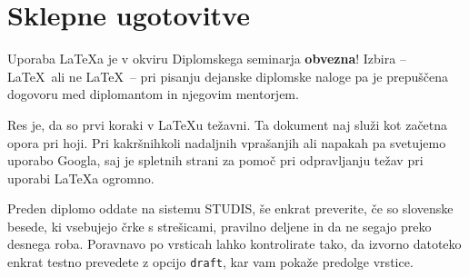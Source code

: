 \chapter{Sklepne ugotovitve}

Uporaba \LaTeX{a} je v okviru Diplomskega seminarja \textbf{obvezna}!
Izbira -- \LaTeX\ ali ne \LaTeX\ -- pri pisanju dejanske diplomske naloge pa je pre\-pu\-šče\-na
dogovoru med diplomantom in njegovim mentorjem.

Res je, da so prvi koraki v \LaTeX{}u težavni.
Ta dokument naj služi kot začetna opora pri hoji.
Pri kakršnihkoli nadaljnih vprašanjih ali napakah pa svetujemo uporabo Googla, saj je spletnih
strani za pomoč pri odpravljanju težav pri uporabi \LaTeX{}a ogromno.

Preden diplomo oddate na sistemu STUDIS, še enkrat preverite, če so slovenske besede, ki vsebujejo
črke s strešicami, pravilno deljene in da ne segajo preko desnega roba.
Poravnavo po vrsticah lahko kontrolirate tako, da izvorno datoteko enkrat testno prevedete z opcijo
\texttt{draft}, kar vam pokaže predolge vrstice.
